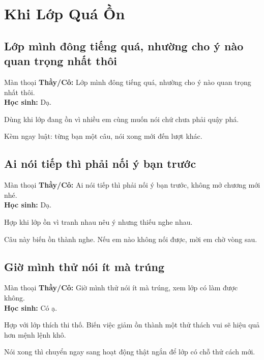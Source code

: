 \chapter{Khi Lớp Quá Ồn}

\section{Lớp mình đông tiếng quá, nhường cho ý nào quan trọng nhất thôi}
\begin{manthoai}{Màn thoại}
\textbf{Thầy/Cô:} Lớp mình đông tiếng quá, nhường cho ý nào quan trọng nhất thôi.\\
\textbf{Học sinh:} Dạ.
\end{manthoai}
\begin{dungkhinào}
Dùng khi lớp đang ồn vì nhiều em cùng muốn nói chứ chưa phải quậy phá.
\end{dungkhinào}
\begin{nhipthem}
Kèm ngay luật: từng bạn một câu, nói xong mới đến lượt khác.
\end{nhipthem}
\ngancach

\section{Ai nói tiếp thì phải nối ý bạn trước}
\begin{manthoai}{Màn thoại}
\textbf{Thầy/Cô:} Ai nói tiếp thì phải nối ý bạn trước, không mở chương mới nhé.\\
\textbf{Học sinh:} Dạ.
\end{manthoai}
\begin{dungkhinào}
Hợp khi lớp ồn vì tranh nhau nêu ý nhưng thiếu nghe nhau.
\end{dungkhinào}
\begin{nhipthem}
Câu này biến ồn thành nghe. Nếu em nào không nối được, mời em chờ vòng sau.
\end{nhipthem}
\ngancach

\section{Giờ mình thử nói ít mà trúng}
\begin{manthoai}{Màn thoại}
\textbf{Thầy/Cô:} Giờ mình thử nói ít mà trúng, xem lớp có làm được không.\\
\textbf{Học sinh:} Có ạ.
\end{manthoai}
\begin{dungkhinào}
Hợp với lớp thích thi thố. Biến việc giảm ồn thành một thử thách vui sẽ hiệu quả hơn mệnh lệnh khô.
\end{dungkhinào}
\begin{nhipthem}
Nói xong thì chuyển ngay sang hoạt động thật ngắn để lớp có chỗ thử cách mới.
\end{nhipthem}
\ngancach

